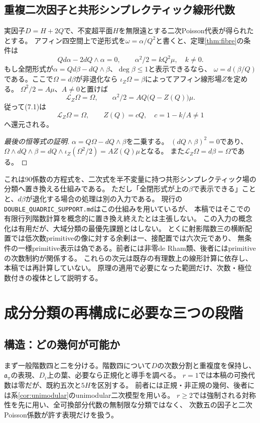 \documentclass[a4paper,11pt]{ltjsarticle}
\theoremstyle{definition}
\theoremstyle{definition}\newtheorem{definition}[theorem]{定義}
\theoremstyle{remark}\newtheorem{remark}[theorem]{注意}
\begin{document}
\subsection{重複二次因子と共形シンプレクティック線形代数}
実因子$D=H+2Q$で、不変超平面$H$を無限遠とする二次Poisson代表が得られたとする。
アフィン四空間上で逆形式を$\omega=\alpha/Q^2$と書くと、定理\ref{thm:fibre}の条件は
\[
 Qd\alpha-2dQ\wedge\alpha=0,\qquad
 \alpha^2/2=kQ^2\mu,\quad k\ne0.                    \tag{7.1}
\]
もし全閉形式が$\alpha=Qd\beta-dQ\wedge\beta$、$\deg\beta\le1$と表示できるなら、
$\omega=d(\beta/Q)$である。ここで$\Omega=d\beta$が非退化なら
$\iota_Z\Omega=\beta$によってアフィン線形場$Z$を定める。
$\Omega^2/2=A\mu$、$A\ne0$と置けば
\[
 \mathcal L_Z\Omega=\Omega,\qquad
 \alpha^2/2=AQ\bigl(Q-Z(Q)\bigr)\mu.
\]
従って(7.1)は
\[
 \mathcal L_Z\Omega=\Omega,\qquad
 Z(Q)=cQ,\quad c=1-k/A\ne1                          \tag{7.2}
\]
へ還元される。
\begin{proof}[最後の恒等式の証明]
$\alpha=Q\Omega-dQ\wedge\beta$を二乗する。
$(dQ\wedge\beta)^2=0$であり、
$\Omega\wedge dQ\wedge\beta=dQ\wedge\iota_Z(\Omega^2/2)=A Z(Q)\mu$となる。
また$\mathcal L_Z\Omega=d\beta=\Omega$である。
\end{proof}

これは90係数の方程式を、二次式を半不変量に持つ共形シンプレクティック場の分類へ置き換える仕組みである。
ただし「全閉形式が上の$\beta$で表示できる」ことと、$d\beta$が退化する場合の処理は別の入力である。
現行の\texttt{DOUBLE\_QUADRIC\_SUPPORT.md}はこの仕組みを用いているが、
本稿ではそこでの有限行列階数計算を概念的に置き換え終えたとは主張しない。
この入力の概念化は有用だが、大域分類の最優先課題とはしない。
とくに射影階数三の横断配置では低次数primitiveの像に対する余剰は一、接配置では六次元であり、
無条件の一様primitive表示は偽である。前者には非零de Rham類、後者にはprimitiveの次数制約が関係する。
これらの次元は既存の有理数上の線形計算に依存し、本稿では再計算していない。
原理の適用で必要になった範囲だけ、次数・極位数付きの複体として説明する。

\section{成分分類の再構成に必要な三つの段階}
\subsection{構造：どの幾何が可能か}
まず一般階数四と二を分ける。階数四について$D$の次数分割と重複度を保持し、
$\mathfrak a_\pi$の表現、$D_i$上の葉、必要なら正規化と導手を調べる。
$r=1$では本稿の可換代数は零だが、既約五次と$5H$を区別する。
前者には正規・非正規の幾何、後者には系\ref{cor:unimodular}のunimodular二次模型を用いる。
$r\ge2$では強制される対称性を先に用い、全可換部分代数の無制限な分類ではなく、
次数五の因子と二次Poisson係数が許す表現だけを扱う。
\end{document}
